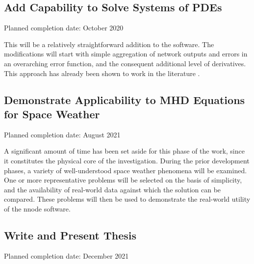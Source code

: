 \documentclass{article}
\begin{document}
\subsection{Add Capability to Solve Systems of PDEs}

Planned completion date: October 2020

This will be a relatively straightforward addition to the software. The modifications will start with simple aggregation of network outputs and errors in an overarching error function, and the consequent additional level of derivatives. This approach has already been shown to work in the literature \cites{Lagaris1998}.

\subsection{Demonstrate Applicability to MHD Equations for Space Weather}

Planned completion date: August 2021

A significant amount of time has been set aside for this phase of the work, since it constitutes the physical core of the investigation. During the prior development phases, a variety of well-understood space weather phenomena will be examined. One or more representative problems will be selected on the basis of simplicity, and the availability of real-world data against which the solution can be compared. These problems will then be used to demonstrate the real-world utility of the nnode software.

\subsection{Write and Present Thesis}

Planned completion date: December 2021


\medskip

\printbibliography[heading=bibintoc]

\end{document}

